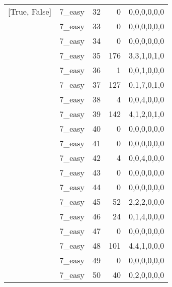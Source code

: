 \begin{tabular}{llrrl}
 [True, False]   & 7\_easy              &            32 &                     0 & 0,0,0,0,0,0   \\
 [True, False]   & 7\_easy              &            33 &                     0 & 0,0,0,0,0,0   \\
 [True, False]   & 7\_easy              &            34 &                     0 & 0,0,0,0,0,0   \\
 [True, False]   & 7\_easy              &            35 &                   176 & 3,3,1,0,1,0   \\
 [True, False]   & 7\_easy              &            36 &                     1 & 0,0,1,0,0,0   \\
 [True, False]   & 7\_easy              &            37 &                   127 & 0,1,7,0,1,0   \\
 [True, False]   & 7\_easy              &            38 &                     4 & 0,0,4,0,0,0   \\
 [True, False]   & 7\_easy              &            39 &                   142 & 4,1,2,0,1,0   \\
 [True, False]   & 7\_easy              &            40 &                     0 & 0,0,0,0,0,0   \\
 [True, False]   & 7\_easy              &            41 &                     0 & 0,0,0,0,0,0   \\
 [True, False]   & 7\_easy              &            42 &                     4 & 0,0,4,0,0,0   \\
 [True, False]   & 7\_easy              &            43 &                     0 & 0,0,0,0,0,0   \\
 [True, False]   & 7\_easy              &            44 &                     0 & 0,0,0,0,0,0   \\
 [True, False]   & 7\_easy              &            45 &                    52 & 2,2,2,0,0,0   \\
 [True, False]   & 7\_easy              &            46 &                    24 & 0,1,4,0,0,0   \\
 [True, False]   & 7\_easy              &            47 &                     0 & 0,0,0,0,0,0   \\
 [True, False]   & 7\_easy              &            48 &                   101 & 4,4,1,0,0,0   \\
 [True, False]   & 7\_easy              &            49 &                     0 & 0,0,0,0,0,0   \\
 [True, False]   & 7\_easy              &            50 &                    40 & 0,2,0,0,0,0   \\

\end{tabular}
